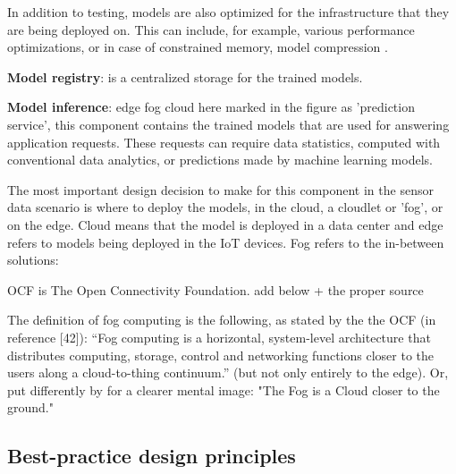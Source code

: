 In addition to testing, models are also optimized for the infrastructure that they are being deployed on. This can include, for example, various performance optimizations, or in case of constrained memory, model compression \cite{iotsurvey}.

\textbf{Model registry}: is a centralized storage for the trained models. 


\textbf{Model inference}: edge fog cloud here marked in the figure as 'prediction service', this component contains the trained models that are used for answering application requests. These requests can require data statistics, computed with conventional data analytics, or predictions made by machine learning models.

The most important design decision to make for this component in the sensor data scenario is where to deploy the models, in the cloud, a cloudlet or 'fog', or on the edge. Cloud means that the model is deployed in a data center and edge refers to models being deployed in the IoT devices. Fog refers to the in-between solutions: 

OCF is The Open Connectivity Foundation. add below + the proper source

The definition of fog computing is the following, as stated by the the OCF (in \cite{fogsurvey} reference [42]): “Fog computing is a horizontal, system-level architecture that distributes computing, storage, control and networking functions closer to the users along a cloud-to-thing continuum.” (but not only entirely to the edge). Or, put differently by \cite{fogsurvey} for a clearer mental image: "The Fog is a Cloud closer to the ground."
\subsection{Best-practice design principles}





